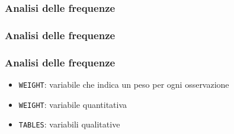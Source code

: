 \documentclass[aspectratio=169]{beamer}
\begin{document}











\begin{frame}[containsverbatim]\frametitle{Analisi delle frequenze}
\end{frame}


\begin{frame}[containsverbatim]\frametitle{Analisi delle frequenze}
\end{frame}

\begin{frame}[containsverbatim]\frametitle{Analisi delle frequenze}
  \begin{itemize}
  \item
    \verb+WEIGHT+: variabile che indica un peso per ogni osservazione
  \item
    \verb+WEIGHT+: variabile quantitativa
  \item
    \verb+TABLES+: variabili qualitative
  \end{itemize}
\end{frame}
\end{document}

